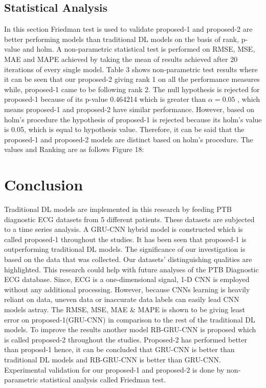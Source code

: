 \documentclass[a4paper, fleqn]{cas-sc}
\begin{document}
\subsection{Statistical Analysis}

In this section Friedman test is used to validate proposed-1 and proposed-2  are better performing models than traditional DL models on the basis of rank,  p-value and holm. A non-parametric statistical test is performed on RMSE,  MSE,  MAE and MAPE achieved by taking the mean of results achieved after 20 iterations of every single model. Table 3 shows non-parametric test results where it can be seen that our proposed-2 giving rank 1 on all the performance measures while,  proposed-1 came to be following rank 2. The null hypothesis is rejected for proposed-1 because of its p-value 0.464214 which is greater than  $\alpha = 0.05$ , 
 which means proposed-1 and proposed-2 have similar performance. However,  based on holm’s procedure the hypothesis of proposed-1 is rejected because its holm’s value is 0.05,  which is equal to hypothesis value. Therefore,  it can be said that the proposed-1 and proposed-2 models are distinct based on holm’s procedure. The values and Ranking are as follows Figure 18:


 \section{Conclusion}
Traditional DL models are implemented in this research by feeding PTB diagnostic ECG datasets from 5 different patients. These datasets are subjected to a time series analysis. A GRU-CNN hybrid model is constructed which is called proposed-1 throughout the studies. It has been seen that proposed-1 is outperforming traditional DL models. The significance of our investigation is based on the data that was collected. Our datasets' distinguishing qualities are highlighted. This research could help with future analyses of the PTB Diagnostic ECG database. Since, ECG is a one-dimensional signal,  1-D CNN is employed without any additional processing. However,  because CNNs learning is heavily reliant on data,  uneven data or inaccurate data labels can easily lead CNN models astray. The RMSE, MSE, MAE \& MAPE is shown to be giving least error on proposed-1(GRU-CNN) in comparison to the rest of the traditional DL models. To improve the results another model RB-GRU-CNN is proposed which is called proposed-2 throughout the studies. Proposed-2 has performed better than proposd-1 hence,  it can be concluded that GRU-CNN is better than traditional DL models and RB-GRU-CNN is better than GRU-CNN. Experimental validation for our proposed-1 and proposed-2 is done by non-parametric statistical analysis called Friedman test. 
\end{document}
